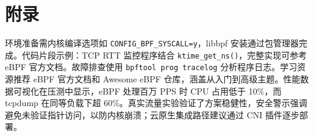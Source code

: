 \chapter{附录}
环境准备需内核编译选项如 \texttt{CONFIG\_{}BPF\_{}SYSCALL=y}，libbpf 安装通过包管理器完成。代码片段示例：TCP RTT 监控程序结合 \texttt{ktime\_{}get\_{}ns()}，完整实现可参考 eBPF 官方文档。故障排查使用 \texttt{bpftool prog tracelog} 分析程序日志。学习资源推荐 eBPF 官方文档和 Awesome eBPF 仓库，涵盖从入门到高级主题。性能数据可视化在压测中显示，eBPF 处理百万 PPS 时 CPU 占用低于 10\%{}，而 tcpdump 在同等负载下超 60\%{}。真实流量实验验证了方案稳健性，安全警示强调避免未验证指针访问，以防内核崩溃；云原生集成路径建议通过 CNI 插件逐步部署。\par
